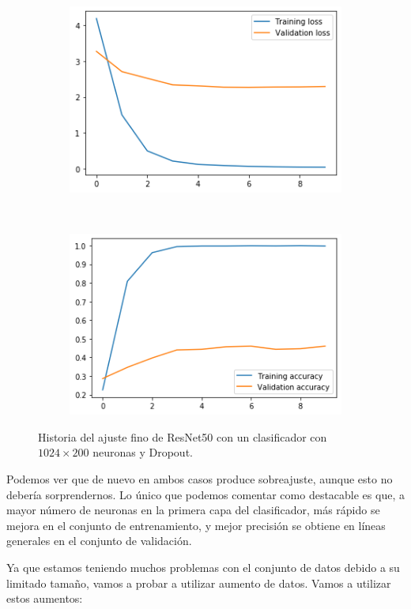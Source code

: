 \documentclass[11pt,a4paper]{article}
\begin{document}
\begin{figure}[H]
  \centering
  \begin{subfigure}{.5\textwidth}
    \centering
    \includegraphics[scale=0.4]{img/fine3-loss.png}
    \label{fig:fine3-loss}
  \end{subfigure}%
  ~ \quad
  \begin{subfigure}{.5\textwidth}
    \centering
    \includegraphics[scale=0.4]{img/fine3-acc.png}
    \label{fig:fine3-acc}
  \end{subfigure}
  \caption{Historia del ajuste fino de ResNet50 con un clasificador con $1024 \times 200$ neuronas y Dropout.}
  \label{fig:history-fine3}
\end{figure}

Podemos ver que de nuevo en ambos casos produce sobreajuste, aunque esto no debería sorprendernos.
Lo único que podemos comentar como destacable es que, a mayor número de neuronas en la primera capa
del clasificador, más rápido se mejora en el conjunto de entrenamiento, y mejor precisión se obtiene en
líneas generales en el conjunto de validación.

Ya que estamos teniendo muchos problemas con el conjunto de datos debido a su limitado tamaño, vamos a probar
a utilizar aumento de datos. Vamos a utilizar estos aumentos:
\end{document}
